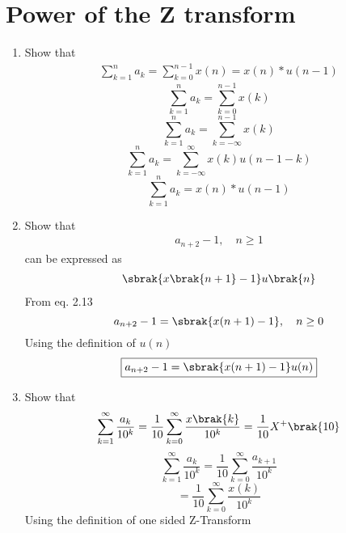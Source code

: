 \documentclass[journal,12pt,twocolumn]{IEEEtran}
\renewcommand\thesection{\arabic{section}}
\begin{document}
\section{Power of the Z transform}
\begin{enumerate}[label=\thesection.\arabic*,ref=\thesection.\theenumi]
\item Show that 
\begin{align}
	\sum_{k=1}^{n}a_k = 
	\sum_{k=0}^{n-1}x(n) = x(n)*u(n-1)
\end{align}
\solution
\begin{equation}
	\sum_{k=1}^{n}a_k = \sum_{k=0}^{n-1}x(k)
\end{equation}
\begin{equation}
	\sum_{k=1}^{n}a_k = \sum_{k=-\infty}^{n-1}x(k)
\end{equation}
\begin{equation}
	\sum_{k=1}^{n}a_k = \sum_{k=-\infty}^{\infty}x(k)u(n-1-k)
\end{equation}
\begin{equation}
	\sum_{k=1}^{n}a_k = x(n)\ast u(n-1)
\end{equation}
\item Show that 
\begin{align}
a_{n+2}-1, \quad n \ge 1
\end{align}
can be expressed as 
\begin{align}
	\sbrak{x\brak{n+1}-1}u\brak{n}
\end{align}
\solution
From eq. 2.13
\begin{equation}
	a_{n+2} - 1 = \sbrak{x(n + 1) - 1}, \quad n \ge 0
\end{equation}
Using the definition of $u(n)$
\begin{equation}
	\boxed{a_{n + 2} - 1 = \sbrak{x(n + 1) - 1}u(n)}
\end{equation}
 \item Show that 
\begin{align}
	\sum_{k=1}^{\infty}\frac{a_k}{10^k}= 
	\frac{1}{10}\sum_{k=0}^{\infty}\frac{x\brak{k}}{10^k} =\frac{1}{10}X^{+}\brak{{10}}
\end{align}
\solution
\begin{equation}
	\sum_{k=1}^{\infty}\frac{a_k}{10^{k}} = \frac{1}{10}\sum_{k=0}^{\infty}\frac{a_{k+1}}{10^{k}}
\end{equation}
\begin{equation}
	= \frac{1}{10}\sum_{k=0}^{\infty}\frac{x(k)}{10^{k}}
\end{equation}
Using the definition of one sided Z-Transform

\end{enumerate}
\end{document}
